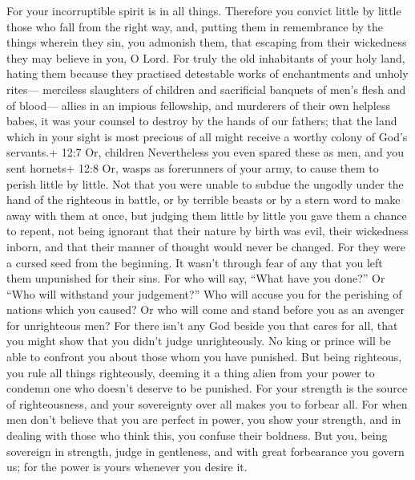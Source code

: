  For your incorruptible spirit is in all things.
 Therefore you convict little by little those who fall from
the right way, and, putting them in remembrance by the things wherein
they sin, you admonish them, that escaping from their wickedness they
may believe in you, O Lord.  For truly the old inhabitants
of your holy land,  hating them because they practised
detestable works of enchantments and unholy rites--- 
merciless slaughters of children and sacrificial banquets of men's flesh
and of blood---  allies in an impious fellowship, and
murderers of their own helpless babes, it was your counsel to destroy by
the hands of our fathers;  that the land which in your sight
is most precious of all might receive a worthy colony of God's
servants.+ 12:7 Or, children  Nevertheless you even spared
these as men, and you sent hornets+ 12:8 Or, wasps as forerunners of
your army, to cause them to perish little by little.  Not
that you were unable to subdue the ungodly under the hand of the
righteous in battle, or by terrible beasts or by a stern word to make
away with them at once,  but judging them little by little
you gave them a chance to repent, not being ignorant that their nature
by birth was evil, their wickedness inborn, and that their manner of
thought would never be changed.  For they were a cursed
seed from the beginning. It wasn't through fear of any that you left
them unpunished for their sins.  For who will say, ``What
have you done?'' Or ``Who will withstand your judgement?'' Who will
accuse you for the perishing of nations which you caused? Or who will
come and stand before you as an avenger for unrighteous men?
 For there isn't any God beside you that cares for all,
that you might show that you didn't judge unrighteously. 
No king or prince will be able to confront you about those whom you have
punished.  But being righteous, you rule all things
righteously, deeming it a thing alien from your power to condemn one who
doesn't deserve to be punished.  For your strength is the
source of righteousness, and your sovereignty over all makes you to
forbear all.  For when men don't believe that you are
perfect in power, you show your strength, and in dealing with those who
think this, you confuse their boldness.  But you, being
sovereign in strength, judge in gentleness, and with great forbearance
you govern us; for the power is yours whenever you desire it.

